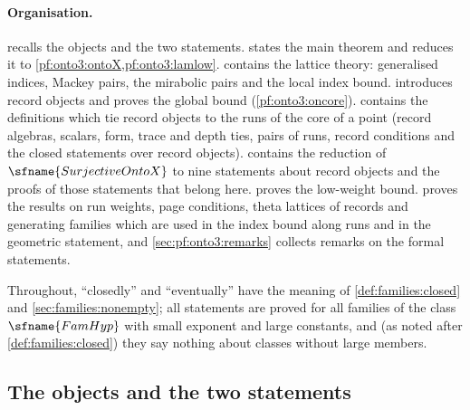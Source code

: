 \paragraph{Organisation.}
 recalls the objects and the two statements.  states the main
theorem and reduces it to \cref{pf:onto3:ontoX,pf:onto3:lamlow}.  contains the
lattice theory: generalised indices, Mackey pairs, the mirabolic pairs and the local index bound.
 introduces record objects and proves the global bound
(\cref{pf:onto3:oncore}).  contains the definitions which tie record objects to the runs of
the core of a point (record algebras, scalars, form, trace and depth ties, pairs of runs, record conditions and the
closed statements over record objects).  contains the reduction of $\sfname{SurjectiveOntoX}$
to nine statements about record objects and the proofs of those statements that belong here.
 proves the low-weight bound.  proves the results on run weights, page
conditions, theta lattices of records and generating families which are used in the index bound along runs and in
the geometric statement, and \cref{sec:pf:onto3:remarks} collects remarks on the formal statements.

Throughout, ``closedly'' and ``eventually'' have the meaning of \cref{def:families:closed} and
\cref{sec:families:nonempty}; all statements are proved for all families of the class $\sfname{FamHyp}$
with small exponent and large constants, and (as noted after \cref{def:families:closed}) they say nothing
about classes without large members.

\subsection{The objects and the two statements}\label{sec:pf:onto3:setting}

